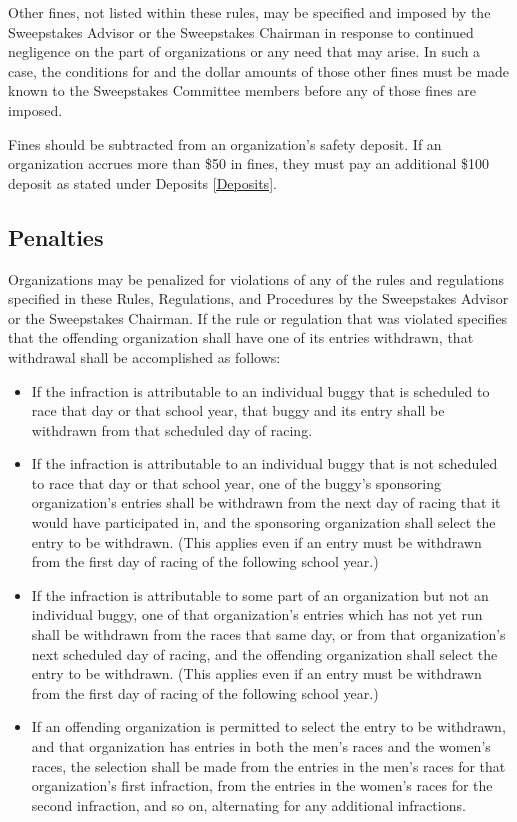 	Other fines, not listed within these rules, may be specified and imposed by the Sweepstakes Advisor or the Sweepstakes Chairman in response to continued negligence on the part of organizations or any need that may arise. In such a case, the conditions for and the dollar amounts of those other fines must be made known to the Sweepstakes Committee members before any of those fines are imposed.

	Fines should be subtracted from an organization's safety deposit. If an organization accrues more than \$50 in fines, they must pay an additional \$100 deposit as stated under Deposits \ref{Deposits}.

\subsection{Penalties}

	Organizations may be penalized for violations of any of the rules and regulations specified in these Rules, Regulations, and Procedures by the Sweepstakes Advisor or the Sweepstakes Chairman. If the rule or regulation that was violated specifies that the offending organization shall have one of its entries withdrawn, that withdrawal shall be accomplished as follows:

	\begin{itemize}

		\item
		If the infraction is attributable to an individual buggy that is scheduled to race that day or that school year, that buggy and its entry shall be withdrawn from that scheduled day of racing.

		\item
		If the infraction is attributable to an individual buggy that is not scheduled to race that day or that school year, one of the buggy's sponsoring organization's entries shall be withdrawn from the next day of racing that it would have participated in, and the sponsoring organization shall select the entry to be withdrawn. (This applies even if an entry must be withdrawn from the first day of racing of the following school year.)

		\item
		If the infraction is attributable to some part of an organization but not an individual buggy, one of that organization's entries which has not yet run shall be withdrawn from the races that same day, or from that organization's next scheduled day of racing, and the offending organization shall select the entry to be withdrawn. (This applies even if an entry must be withdrawn from the first day of racing of the following school year.)

		\item
		If an offending organization is permitted to select the entry to be withdrawn, and that organization has entries in both the men's races and the women's races, the selection shall be made from the entries in the men's races for that organization's first infraction, from the entries in the women's races for the second infraction, and so on, alternating for any additional infractions.

	\end{itemize}

